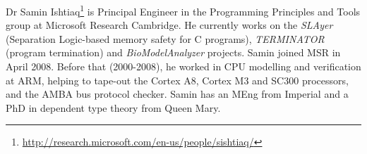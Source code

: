 \documentclass[a4paper,11pt]{article}
\begin{document}
Dr Samin
Ishtiaq\footnote{\url{http://research.microsoft.com/en-us/people/sishtiaq/}}
is Principal Engineer in the Programming Principles and Tools group at
Microsoft Research Cambridge. He currently works on the {\emph{SLAyer}}
(Separation Logic-based memory safety for C programs), {\emph{TERMINATOR}}
(program termination) and {\emph{BioModelAnalyzer}} projects. Samin joined MSR in April
2008. Before that (2000-2008), he worked in CPU modelling and
verification at ARM, helping to tape-out the Cortex A8, Cortex M3 and
SC300 processors, and the AMBA bus protocol checker. Samin has an MEng
from Imperial and a PhD in dependent type theory from Queen Mary.



\end{document}
